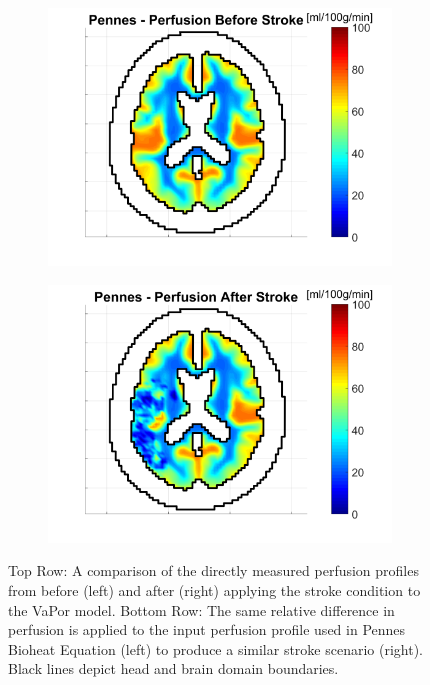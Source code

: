\documentclass[11pt,english,a4paper,twoside,openright]{report}
\begin{document}
{{{{{{{\begin{figure}[h]
\begin{subfigure}[b]{0.49\textwidth}
		\includegraphics[width=\textwidth]{Chapter5/Chapter5_StrokePerfusion1_Pennes}
	\end{subfigure}
	\begin{subfigure}[b]{0.49\textwidth}
		\includegraphics[width=\textwidth]{Chapter5/Chapter5_StrokePerfusion2_Pennes}
	\end{subfigure}
	\caption[Comparison of directly measured perfusion profiles before and after simulated stroke]{Top Row: A comparison of the directly measured perfusion profiles from before (left) and after (right) applying the stroke condition to the VaPor model. Bottom Row: The same relative difference in perfusion is applied to the input perfusion profile used in Pennes Bioheat Equation (left) to produce a similar stroke scenario (right). Black lines depict head and brain domain boundaries.}
	\label{fig:StrokePerfusion}
\end{figure}

}}}}}}}
\end{document}
